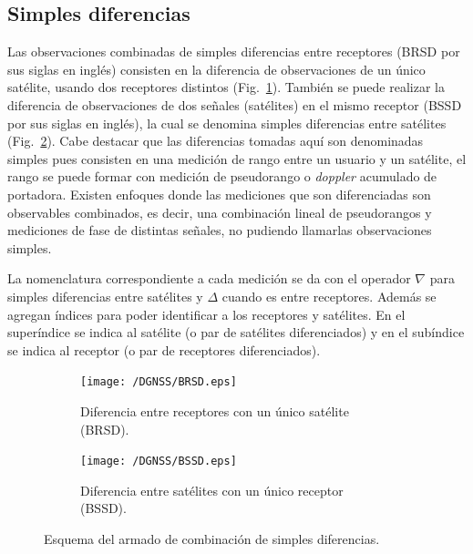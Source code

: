 \documentclass[a4paper,12pt,oneside,onecolumn,final,openright]{book}%
\begin{document}
\subsection{Simples diferencias}\label{sec:SD}
	Las observaciones combinadas de simples diferencias entre receptores (BRSD por sus siglas en inglés) consisten en la diferencia de observaciones de un único satélite, usando dos receptores distintos (Fig.~\ref{fig:BRSD}). También se puede realizar la diferencia de observaciones de dos señales (satélites) en el mismo receptor (BSSD por sus siglas en inglés), la cual se denomina simples diferencias entre satélites (Fig.~\ref{fig:BSSD}). Cabe destacar que las diferencias tomadas aquí son denominadas simples pues consisten en una medición de rango entre un usuario y un satélite, el rango se puede formar con medición de pseudorango o \textit{doppler} acumulado de portadora. Existen enfoques donde las mediciones que son diferenciadas son observables combinados, es decir, una combinación lineal de pseudorangos y mediciones de fase de distintas señales, no pudiendo llamarlas observaciones simples.

	La nomenclatura correspondiente a cada medición se da con el operador $\nabla$ para simples diferencias entre satélites y $\Delta$ cuando es entre receptores. Además se agregan índices para poder identificar a los receptores y satélites. En el superíndice se indica al satélite (o par de satélites diferenciados) y en el subíndice se indica al receptor (o par de receptores diferenciados).

\begin{figure}
    \begin{subfigure}{.49\textwidth}
    \centering
    \texttt{[image: /DGNSS/BRSD.eps]}
    \caption{Diferencia entre receptores con un único satélite (BRSD).}
    \label{fig:BRSD}
    \end{subfigure}
    \begin{subfigure}{.49\textwidth}
      \centering
      \texttt{[image: /DGNSS/BSSD.eps]}
      \caption{Diferencia entre satélites con un único receptor (BSSD).}
      \label{fig:BSSD}
    \end{subfigure}
    \caption{Esquema del armado de combinación de simples diferencias.}
    \label{fig:SimpleDiff}
\end{figure}
\end{document}

